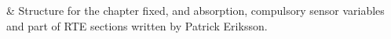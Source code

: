 %
%
 \label{sec:fm_defs}

%
%
 & Structure for the chapter fixed, and absorption, compulsory sensor 
           variables and part of RTE sections written by Patrick Eriksson.\\
\stophistory


%
%
%



